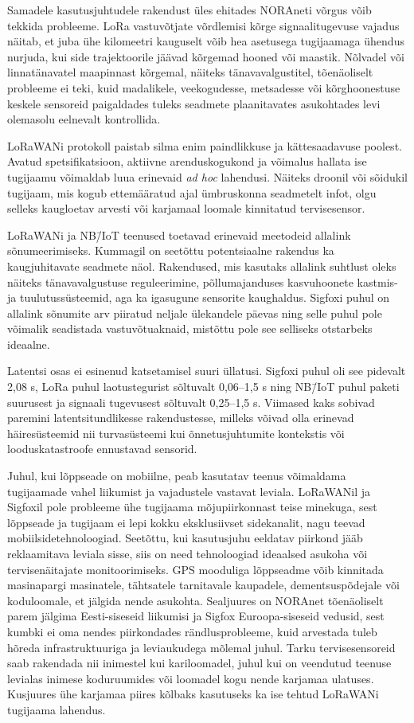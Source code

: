 \documentclass[12pt]{article}
\begin{document}
    Samadele kasutusjuhtudele rakendust üles ehitades NORAneti võrgus võib tekkida probleeme.
    LoRa vastuvõtjate võrdlemisi kõrge signaalitugevuse vajadus näitab, et juba ühe kilomeetri kauguselt võib hea asetusega tugijaamaga ühendus nurjuda, kui side trajektoorile jäävad kõrgemad hooned või maastik.
    Nõlvadel või linnatänavatel maapinnast kõrgemal, näiteks tänavavalgustitel, tõenäoliselt probleeme ei teki, kuid madalikele, veekogudesse, metsadesse või kõrghoonestuse keskele sensoreid paigaldades tuleks seadmete plaanitavates asukohtades levi olemasolu eelnevalt kontrollida.

    LoRaWANi protokoll paistab silma enim paindlikkuse ja kättesaadavuse poolest.
    Avatud spetsifikatsioon, aktiivne arenduskogukond ja võimalus hallata ise tugijaamu võimaldab luua erinevaid \textit{ad hoc} lahendusi.
    Näiteks droonil või sõidukil tugijaam, mis kogub ettemääratud ajal ümbruskonna seadmetelt infot, olgu selleks kaugloetav arvesti või karjamaal loomale kinnitatud tervisesensor.

    LoRaWANi ja NB\=/IoT teenused toetavad erinevaid meetodeid allalink sõnumeerimiseks.
    Kummagil on seetõttu potentsiaalne rakendus ka kaugjuhitavate seadmete näol.
    Rakendused, mis kasutaks allalink suhtlust oleks näiteks tänavavalgustuse reguleerimine, põllumajanduses kasvuhoonete kastmis- ja tuulutussüsteemid, aga ka igasugune sensorite kaughaldus.
    Sigfoxi puhul on allalink sõnumite arv piiratud neljale ülekandele päevas ning selle puhul pole võimalik seadistada vastuvõtuaknaid, mistõttu pole see selliseks otstarbeks ideaalne.

    Latentsi osas ei esinenud katsetamisel suuri üllatusi.
    Sigfoxi puhul oli see pidevalt 2,08 s, LoRa puhul laotustegurist sõltuvalt 0,06--1,5 s ning NB\=/IoT puhul paketi suurusest ja signaali tugevusest sõltuvalt 0,25--1,5 s.
    Viimased kaks sobivad paremini latentsitundlikesse rakendustesse, milleks võivad olla erinevad häiresüsteemid nii turvasüsteemi kui õnnetusjuhtumite kontekstis või looduskatastroofe ennustavad sensorid.

    Juhul, kui lõppseade on mobiilne, peab kasutatav teenus võimaldama tugijaamade vahel liikumist ja vajadustele vastavat leviala.
    LoRaWANil ja Sigfoxil pole probleeme ühe tugijaama mõjupiirkonnast teise minekuga, sest lõppseade ja tugijaam ei lepi kokku eksklusiivset sidekanalit, nagu teevad mobiilsidetehnoloogiad.
    Seetõttu, kui kasutusjuhu eeldatav piirkond jääb reklaamitava leviala sisse, siis on need tehnoloogiad ideaalsed asukoha või tervisenäitajate monitoorimiseks.
    GPS mooduliga lõppseadme võib kinnitada masinapargi masinatele, tähtsatele tarnitavale kaupadele, dementsuspõdejale või koduloomale, et jälgida nende asukohta.
    Sealjuures on NORAnet tõenäoliselt parem jälgima Eesti-siseseid liikumisi ja Sigfox Euroopa-siseseid vedusid, sest kumbki ei oma nendes piirkondades rändlusprobleeme, kuid arvestada tuleb hõreda infrastruktuuriga ja leviaukudega mõlemal juhul.
    Tarku tervisesensoreid saab rakendada nii inimestel kui kariloomadel, juhul kui on veendutud teenuse levialas inimese koduruumides või loomadel kogu nende karjamaa ulatuses.
    Kusjuures ühe karjamaa piires kõlbaks kasutuseks ka ise tehtud LoRaWANi tugijaama lahendus.
\end{document}
